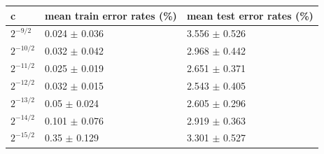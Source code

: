 \begin{tabular}{lll}
\toprule
c & mean train error rates (\%) & mean test error rates (\%) \\
\midrule
$2^{-9/2}$ & 0.024 $\pm$ 0.036 & 3.556 $\pm$ 0.526 \\
$2^{-10/2}$ & 0.032 $\pm$ 0.042 & 2.968 $\pm$ 0.442 \\
$2^{-11/2}$ & 0.025 $\pm$ 0.019 & 2.651 $\pm$ 0.371 \\
$2^{-12/2}$ & 0.032 $\pm$ 0.015 & 2.543 $\pm$ 0.405 \\
$2^{-13/2}$ & 0.05 $\pm$ 0.024 & 2.605 $\pm$ 0.296 \\
$2^{-14/2}$ & 0.101 $\pm$ 0.076 & 2.919 $\pm$ 0.363 \\
$2^{-15/2}$ & 0.35 $\pm$ 0.129 & 3.301 $\pm$ 0.527 \\
\bottomrule
\end{tabular}
